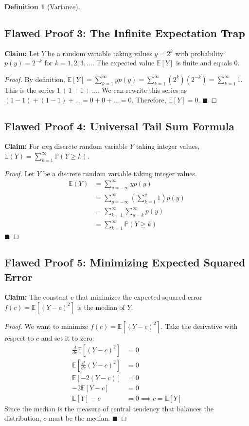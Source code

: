 \documentclass[11pt,letterpaper]{article}
\theoremstyle{definition}
\newtheorem{definition}{Definition}[section]
\theoremstyle{plain}
\theoremstyle{remark}
\newcommand{\E}{\mathbb{E}}
\newcommand{\Prob}{\mathbb{P}}
\begin{document}
\begin{definition}[Variance]
\subsection{Flawed Proof 3: The Infinite Expectation Trap}
\textbf{Claim:} Let $Y$ be a random variable taking values $y = 2^k$ with probability $p(y) = 2^{-k}$ for $k = 1, 2, 3, \dots$. The expected value $\E[Y]$ is finite and equals 0.
\begin{proof}
By definition, $\E[Y] = \sum_{k=1}^\infty y p(y) = \sum_{k=1}^\infty (2^k)(2^{-k}) = \sum_{k=1}^\infty 1$.
This is the series $1 + 1 + 1 + \dots$.
We can rewrite this series as $(1 - 1) + (1 - 1) + \dots = 0 + 0 + \dots = 0$.
Therefore, $\E[Y] = 0$. $\blacksquare$
\end{proof}

\subsection{Flawed Proof 4: Universal Tail Sum Formula}
\textbf{Claim:} For \textit{any} discrete random variable $Y$ taking integer values, $\E(Y) = \sum_{k=1}^\infty \Prob(Y \ge k)$.
\begin{proof}
Let $Y$ be a discrete random variable taking integer values.
\begin{align*}
\E(Y) &= \sum_{y=-\infty}^\infty y p(y) \\
&= \sum_{y=-\infty}^\infty \left( \sum_{k=1}^y 1 \right) p(y) \\
&= \sum_{k=1}^\infty \sum_{y=k}^\infty p(y) \\
&= \sum_{k=1}^\infty \Prob(Y \ge k)
\end{align*}
$\blacksquare$
\end{proof}

\subsection{Flawed Proof 5: Minimizing Expected Squared Error}
\textbf{Claim:} The constant $c$ that minimizes the expected squared error $f(c) = \E[(Y - c)^2]$ is the median of $Y$.
\begin{proof}
We want to minimize $f(c) = \E[(Y - c)^2]$.
Take the derivative with respect to $c$ and set it to zero:
\begin{align*}
\frac{d}{dc} \E[(Y - c)^2] &= 0 \\
\E\left[ \frac{d}{dc} (Y - c)^2 \right] &= 0 \\
\E[ -2(Y - c) ] &= 0 \\
-2\E[Y - c] &= 0 \\
\E[Y] - c &= 0 \implies c = \E[Y]
\end{align*}
Since the median is the measure of central tendency that balances the distribution, $c$ must be the median. $\blacksquare$
\end{proof}


\end{definition}
\end{document}
